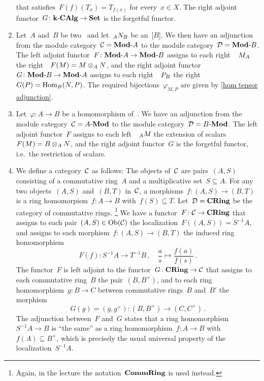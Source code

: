 \begin{example}
\begin{enumerate}
\[      \]
      that satisfies~$F(f)(T_x) = T_{f(x)}$ for every~$x \in X$.
      The right adjoint functor~$G \colon \text{$\mathbf{k}$-$\mathbf{CAlg}$} \to \mathbf{Set}$ is the forgetful functor.
    \item
      Let~$A$ and~$B$ be two~{\kalgs} and let~$\indmodule[A]{N}[B]$ be an~{[$B$]}.
      We then have an adjunction from the module category~$\mathcal{C} = \text{$\mathbf{Mod}$-$A$}$ to the module category~$\mathcal{D} = \text{$\mathbf{Mod}$-$B$}$.
      The left adjoint functor~$F \colon \text{$\mathbf{Mod}$-$A$} \to \text{$\mathbf{Mod}$-$B$}$ assigns to each right~{}~$\indmodule{M}[A]$ the right~{}~$F(M) = M \otimes_A N$, and the right adjoint functor~$G \colon \text{$\mathbf{Mod}$-$B$} \to \text{$\mathbf{Mod}$-$A$}$ assigns to each right~{}~$\indmodule{P}[B]$ the right~{}~$G(P) = \operatorname{Hom}_B(N,P)$.
      The required bijections~$\varphi_{M,P}$ are given by \cref{hom tensor adjunction}.
    \item
      Let~$\varphi \colon A \to B$ be a homomorphism of~{\kalgs}.
      We have an adjunction from the module category~$\mathcal{C} = \text{$A$-$\mathbf{Mod}$}$ to the module category~$\mathcal{D} = \text{$B$-$\mathbf{Mod}$}$.
      The left adjoint functor~$F$ assigns to each left~{}~$\indmodule[A]{M}$ the extension of scalars~$F(M) = B \otimes_A N$, and the right adjoint functor~$G$ is the forgetful functor, i.e.\ the restriction of scalars.
    \item
      We define a category~$\mathcal{C}$ as follows:
      The objects of~$\mathcal{C}$ are pairs~$(A,S)$ consisting of a commutative ring~$A$ and a multiplicative set~$S \subseteq A$.
      For any two objects~$(A,S)$ and~$(B,T)$ in~$\mathcal{C}$, a morphisms~$f \colon (A,S) \to (B,T)$ is a ring homomorpism~$f \colon A \to B$ with~$f(S) \subseteq T$.
      Let~$\mathcal{D} = \mathbf{CRing}$ be the category of commutative rings.%
      \footnote{Again, in the lecture the notation~$\mathbf{CommRing}$ is used instead.}
      We have a functor~$F \colon \mathcal{C} \to \mathbf{CRing}$ that assigns to each pair~$(A,S) \in \operatorname{Ob}(\mathcal{C})$ the localization~$F((A,S)) = S^{-1} A$, and assigns to each morphism~$f \colon (A,S) \to (B,T)$ the induced ring homomorphism
      \[
                F(f)
        \colon  S^{-1} A
        \to     T^{-1} B \,,
        \quad   \frac{a}{s}
        \mapsto \frac{f(a)}{f(s)} \,.
      \]
      The functor~$F$ is left adjoint to the functor~$G \colon \mathbf{CRing} \to \mathcal{C}$ that assigns to each commutative ring~$B$ the pair~$(B,B^\times)$, and to each ring homomorphism~$g \colon B \to C$ between commutative rings~$B$ and~$B'$ the morphism
      \[
                G(g)
        =       (g, g^\times)
        \colon  (B, B^\times)
        \to     (C, C^\times) \,.
      \]
      The adjunction between~$F$ and~$G$ states that a ring homomorphism~$S^{-1} A \to B$ is \enquote{the same} as a ring homomorphism~$f \colon A \to B$ with~$f(A) \subseteq B^\times$, which is precisely the usual universal property of the localization~$S^{-1} A$.
  \end{enumerate}
\end{example}


